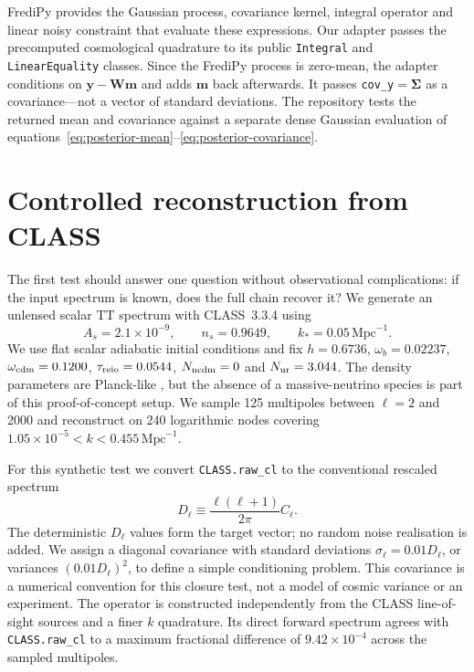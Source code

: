 \documentclass[11pt,a4paper]{article}
\newcommand{\Mpc}{\mathrm{Mpc}}
\begin{document}
FrediPy provides the Gaussian process, covariance kernel, integral operator and
linear noisy constraint that evaluate these expressions.  Our adapter passes
the precomputed cosmological quadrature to its public \texttt{Integral} and
\texttt{LinearEquality} classes.  Since the FrediPy process is zero-mean, the
adapter conditions on $\bm y-\bm W\bm m$ and adds $\bm m$ back afterwards.  It
passes \texttt{cov\_y}$=\bm\Sigma$ as a covariance---not a vector of standard
deviations.  The repository tests the returned mean and covariance against a
separate dense Gaussian evaluation of
equations~\eqref{eq:posterior-mean}--\eqref{eq:posterior-covariance}.

\section{Controlled reconstruction from CLASS}
\label{sec:synthetic}

The first test should answer one question without observational complications:
if the input spectrum is known, does the full chain recover it?  We generate an
unlensed scalar TT spectrum with CLASS~3.3.4 using
\begin{equation}
 A_s=2.1\times10^{-9},\qquad n_s=0.9649,
 \qquad k_*=0.05\,\Mpc^{-1}.
\end{equation}
We use flat scalar adiabatic initial conditions and fix
$h=0.6736$, $\omega_b=0.02237$, $\omega_{\rm cdm}=0.1200$,
$\tau_{\rm reio}=0.0544$, $N_{\rm ncdm}=0$ and $N_{\rm ur}=3.044$.  The
density parameters are Planck-like \citep{planck2018vi}, but the absence of a
massive-neutrino species is part of this proof-of-concept setup.  We sample 125
multipoles between $\ell=2$ and 2000 and reconstruct on 240 logarithmic nodes
covering $1.05\times10^{-5}<k<0.455\,\Mpc^{-1}$.

For this synthetic test we convert \texttt{CLASS.raw\_cl} to the conventional
rescaled spectrum
\begin{equation}
 D_\ell\equiv\frac{\ell(\ell+1)}{2\pi}C_\ell .
 \label{eq:dell}
\end{equation}
The deterministic $D_\ell$ values form the target vector; no random noise
realisation is added.  We assign a diagonal covariance with standard
deviations $\sigma_\ell=0.01D_\ell$, or variances $(0.01D_\ell)^2$, to define a
simple conditioning problem.  This covariance is a numerical convention for
this closure test, not a model of cosmic variance or an experiment.  The operator
is constructed independently from the CLASS line-of-sight sources and a finer
$k$ quadrature.  Its direct forward spectrum agrees with
\texttt{CLASS.raw\_cl} to a maximum fractional difference of
$9.42\times10^{-4}$ across the sampled multipoles.
\end{document}
